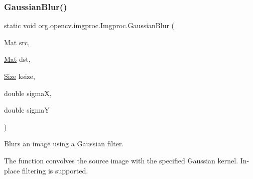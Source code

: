 \mbox{\label{classorg_1_1opencv_1_1imgproc_1_1_imgproc_a6550b1518d3df5dc446f27cd8f1c2285}} 
\subsubsection{\texorpdfstring{Gaussian\+Blur()}{GaussianBlur()}\hspace{0.1cm}{\footnotesize\ttfamily [2/3]}}
{\footnotesize\ttfamily static void org.\+opencv.\+imgproc.\+Imgproc.\+Gaussian\+Blur (\begin{DoxyParamCaption}\item[{\mbox{\hyperlink{classorg_1_1opencv_1_1core_1_1_mat}{Mat}}}]{src,  }\item[{\mbox{\hyperlink{classorg_1_1opencv_1_1core_1_1_mat}{Mat}}}]{dst,  }\item[{\mbox{\hyperlink{classorg_1_1opencv_1_1core_1_1_size}{Size}}}]{ksize,  }\item[{double}]{sigmaX,  }\item[{double}]{sigmaY }\end{DoxyParamCaption})\hspace{0.3cm}{\ttfamily [static]}}

Blurs an image using a Gaussian filter.

The function convolves the source image with the specified Gaussian kernel. In-\/place filtering is supported.


